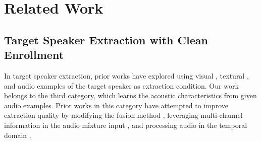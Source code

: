 \section{Related Work}





\subsection{Target Speaker Extraction with Clean Enrollment}

In target speaker extraction, prior works have explored using visual \cite{pan2022selectivelistening, muse}, textural \cite{ma2024clapsep, typingtolistern}, and audio examples \cite{speakerbeam, spex, spex+, zhang2024multilevelspeakerrepresentationtarget} of the target speaker as extraction condition. Our work belongs to the third category, which learns the acoustic characteristics from given audio examples.
Prior works in this category have attempted to improve extraction quality by modifying the fusion method \cite{he2024hierarchicalspeaker, zeng2024useftse}, leveraging multi-channel information in the audio mixture input \cite{meng2024binauralselective, pandey2024neurallowlatency}, and processing audio in the temporal domain \cite{spex, spex+}. 


